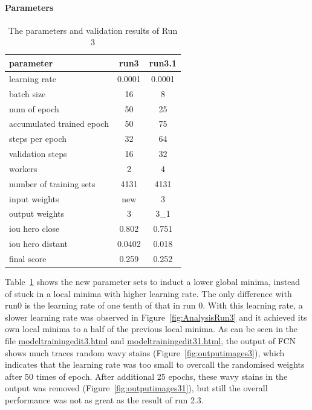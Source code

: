 \documentclass[paper=a4, fontsize=11pt]{scrartcl} %
\numberwithin{equation}{section} %
\numberwithin{figure}{section} %
\numberwithin{table}{section} %
\begin{document}
\paragraph{Parameters}\label{rubric22}
\begin{table}
	\begin{center}
		\begin{tabular}{ l | c | c }
		\hline
		parameter & run3 & run3.1 \\ \hline
		learning rate & 0.0001 & 0.0001 \\ \hline
		batch size    & 16 & 8 \\ \hline
		num of epoch  & 50 & 25 \\ \hline
		accumulated trained epoch & 50 & 75 \\ \hline
		steps per epoch & 32 & 64 \\ \hline
		validation steps & 16 & 32 \\ \hline
		workers & 2 & 4  \\ \hline
		number of training sets & 4131 & 4131 \\ \hline
		input weights & new & 3 \\ \hline
		output weights & 3 & 3\_1\\ 		
		\hline \hline
		iou hero close &0.802 & 0.751 \\ \hline	  
		iou hero distant & 0.0402 & 0.018 \\ \hline
		final score & 0.259& 0.252 \\
		\hline
		\end{tabular}
		\caption{The parameters and validation results of Run 3}
		\label{tab:parameters3}
	\end{center}
\end{table}

Table~\ref{tab:parameters3} shows the new parameter sets to induct a lower global minima, instead of stuck in a local minima with higher learning rate. The only difference with run0 is the learning rate of one tenth of that in run 0. 
With this learning rate, a slower learning rate was observed in Figure~\ref{fig:AnalysisRun3} and it achieved its own local minima to a half of the previous local minima. As can be seen in the file \href{run:./JupyterNotebooks/modeltrainingedit3.html}{modeltrainingedit3.html} and \href{run:./JupyterNotebooks/modeltrainingedit31.html}{modeltrainingedit31.html}, the output of FCN shows much traces random wavy stains (Figure~\ref{fig:outputimages3}), which indicates that the learning rate was too small to overcall the randomised weights after 50 times of epoch. After additional 25 epochs, these wavy stains in the output was removed (Figure~\ref{fig:outputimages31}), but still the overall performance was not as great as the result of run 2.3.
\end{document}
